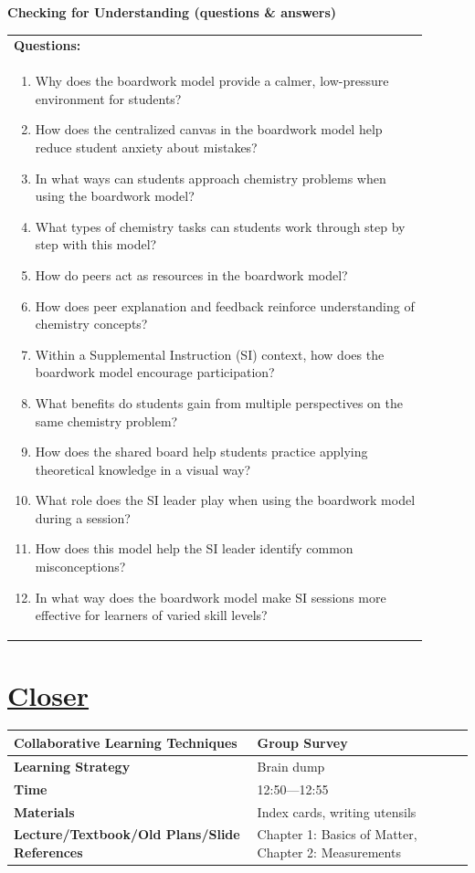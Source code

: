 \documentclass{article}
\begin{document}
\newpage
\noindent
{\large\textbf{Checking for Understanding (questions \& answers)}}\\[0.2em]
\begin{tabular}{|p{0.9\linewidth}|}
\hline
\textbf{Questions:} \\
\begin{enumerate}
\item Why does the boardwork model provide a calmer, low-pressure environment for students?  
\item How does the centralized canvas in the boardwork model help reduce student anxiety about mistakes?  
\item In what ways can students approach chemistry problems when using the boardwork model?  
\item What types of chemistry tasks can students work through step by step with this model?  
\item How do peers act as resources in the boardwork model?  
\item How does peer explanation and feedback reinforce understanding of chemistry concepts?  
\item Within a Supplemental Instruction (SI) context, how does the boardwork model encourage participation?  
\item What benefits do students gain from multiple perspectives on the same chemistry problem?  
\item How does the shared board help students practice applying theoretical knowledge in a visual way?  
\item What role does the SI leader play when using the boardwork model during a session?  
\item How does this model help the SI leader identify common misconceptions?  
\item In what way does the boardwork model make SI sessions more effective for learners of varied skill levels?  
\end{enumerate} \\
\hline  
\end{tabular}

\newpage
\noindent
\section*{\underline{Closer}}
\begin{tabular}{|p{4.2cm}|p{9.8cm}|}
\hline
\textbf{Collaborative Learning Techniques} & Group Survey\\
\hline
\textbf{Learning Strategy} & Brain dump\\
\hline
\textbf{Time} & 12:50---12:55\\
\hline
\textbf{Materials} & Index cards, writing utensils\\
\hline
\textbf{Lecture/Textbook/Old Plans/Slide References} & Chapter 1: Basics of Matter, Chapter 2: Measurements\\
\hline
\end{tabular}
\end{document}

